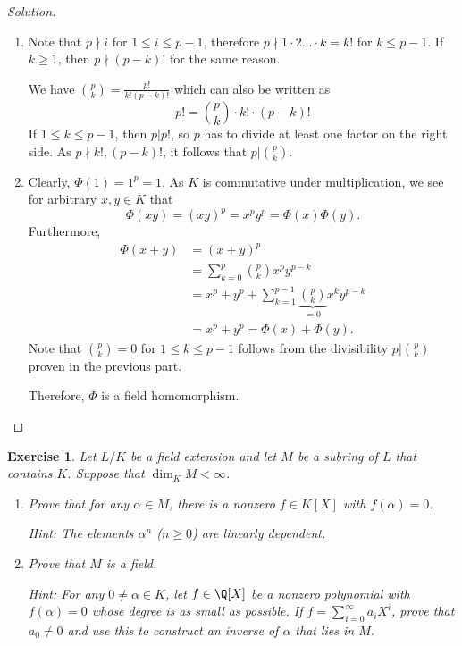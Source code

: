 \documentclass[a4paper,10pt,reqno]{amsart}
\newtheorem{ex}{Exercise}[section]
\newenvironment{sol}
  {\renewcommand\qedsymbol{$\blacksquare$}\begin{proof}[Solution]}
  {\end{proof}}
\begin{document}
\begin{sol}~

    \begin{enumerate}[label=(\roman*)]
        \item Note that $p \nmid i$ for $1 \leq i \leq p-1$, therefore $p \nmid 1 \cdot 2 \ldots \cdot k = k!$ for $k \leq p-1$. If $k \geq 1$, then $p \nmid (p-k)!$ for the same reason.

        We have $\binom{p}{k} = \frac{p!}{k!(p-k)!}$ which can also be written as
        \[
        p! = \binom{p}{k} \cdot k! \cdot (p-k)!
        \]
        If $1 \leq k \leq p-1$, then $p|p!$, so $p$ has to divide at least one factor on the right side. As $p \nmid k!,(p-k)!$, it follows that $p | \binom{p}{k}$.

        \item Clearly, $\Phi(1) = 1^p = 1$. As $K$ is commutative under multiplication, we see for arbitrary $x,y \in K$ that
        \[
        \Phi(xy) = (xy)^p = x^py^p = \Phi(x) \Phi(y).
        \]
        Furthermore,
        \begin{align*}
            \Phi(x+y) & = (x+y)^p \\
            & = \sum_{k=0}^p \binom{p}{k}x^py^{p-k} \\
            & = x^p + y^p + \sum_{k=1}^{p-1} \underbrace{\binom{p}{k}}_{=0}x^ky^{p-k} \\
            & = x^p + y^p = \Phi(x) + \Phi(y).
        \end{align*}
        Note that $\binom{p}{k} = 0$ for $1 \leq k \leq p-1$ follows from the divisibility $p | \binom{p}{k}$ proven in the previous part.

        Therefore, $\Phi$ is a field homomorphism.
    \end{enumerate}
\end{sol}

\begin{ex}
\label{1.6}
    Let $L/K$ be a field extension and let $M$ be a subring of $L$ that contains $K$. Suppose that $\dim_KM < \infty$.
    \begin{enumerate}[label=(\roman*)]
        \item Prove that for any $\alpha \in M$, there is a nonzero $f \in K[X]$ with $f(\alpha) = 0$.

        \noindent \textit{Hint:} The elements $\alpha^n$ ($n \geq 0$) are linearly dependent.
        
        \item Prove that $M$ is a field.
        
        \noindent \textit{Hint:} For any $0 \neq \alpha \in K$, let $f \in \Q[X]$ be a nonzero polynomial with $f(\alpha) = 0$ whose degree is as small as possible. If $f = \sum_{i=0}^{\infty} a_iX^i$, prove that $a_0 \neq 0$ and use this to construct an inverse of $\alpha$ that lies in $M$.
    \end{enumerate}
\end{ex}
\end{document}
